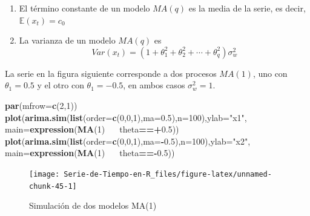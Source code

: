 \documentclass[12pt,]{krantz}
\makeatletter
\newenvironment{Shaded}{\begin{snugshade}}{\end{snugshade}}
\newcommand{\KeywordTok}[1]{\textcolor[rgb]{0.13,0.29,0.53}{\textbf{#1}}}
\newcommand{\DataTypeTok}[1]{\textcolor[rgb]{0.13,0.29,0.53}{#1}}
\newcommand{\DecValTok}[1]{\textcolor[rgb]{0.00,0.00,0.81}{#1}}
\newcommand{\FloatTok}[1]{\textcolor[rgb]{0.00,0.00,0.81}{#1}}
\newcommand{\StringTok}[1]{\textcolor[rgb]{0.31,0.60,0.02}{#1}}
\newcommand{\OperatorTok}[1]{\textcolor[rgb]{0.81,0.36,0.00}{\textbf{#1}}}
\newcommand{\ErrorTok}[1]{\textcolor[rgb]{0.64,0.00,0.00}{\textbf{#1}}}
\newcommand{\NormalTok}[1]{#1}
\newenvironment{kframe}{%
\medskip{}
\setlength{\fboxsep}{.8em}
 \def\at@end@of@kframe{}%
 \ifinner\ifhmode%
  \def\at@end@of@kframe{\end{minipage}}%
  \begin{minipage}{\columnwidth}%
 \fi\fi%
 \def\FrameCommand##1{\hskip\@totalleftmargin \hskip-\fboxsep
 \colorbox{shadecolor}{##1}\hskip-\fboxsep
     \hskip-\linewidth \hskip-\@totalleftmargin \hskip\columnwidth}%
 \MakeFramed {\advance\hsize-\width
   \@totalleftmargin\z@ \linewidth\hsize
   \@setminipage}}%
 {\par\unskip\endMakeFramed%
 \at@end@of@kframe}
\renewenvironment{Shaded}{\begin{kframe}}{\end{kframe}}
\theoremstyle{definition}
\theoremstyle{definition}
\theoremstyle{definition}
\theoremstyle{remark}
\makeatother
\begin{document}
\begin{enumerate}
\def\labelenumi{\arabic{enumi})}
\item
  El término constante de un modelo \(MA(q)\) es la media de la serie,
  es decir, \(\mathbb{E}(x_t)=c_0\)
\item
  La varianza de un modelo \(MA(q)\) es
  \[Var(x_t)=(1+\theta_1^2+\theta_2^2+\cdots+\theta_q^2)\sigma_w^2\]
\end{enumerate}

La serie en la figura siguiente corresponde a dos procesos \(MA(1)\),
uno con \(\theta_1=0.5\) y el otro con \(\theta_1=-0.5\), en ambos casos
\(\sigma_w^2=1\).

\begin{Shaded}
\begin{Highlighting}[]
\KeywordTok{par}\NormalTok{(}\DataTypeTok{mfrow=}\KeywordTok{c}\NormalTok{(}\DecValTok{2}\NormalTok{,}\DecValTok{1}\NormalTok{))}
\KeywordTok{plot}\NormalTok{(}\KeywordTok{arima.sim}\NormalTok{(}\KeywordTok{list}\NormalTok{(}\DataTypeTok{order=}\KeywordTok{c}\NormalTok{(}\DecValTok{0}\NormalTok{,}\DecValTok{0}\NormalTok{,}\DecValTok{1}\NormalTok{),}\DataTypeTok{ma=}\FloatTok{0.5}\NormalTok{),}\DataTypeTok{n=}\DecValTok{100}\NormalTok{),}\DataTypeTok{ylab=}\StringTok{"x1"}\NormalTok{,}
     \DataTypeTok{main=}\KeywordTok{expression}\NormalTok{(}\KeywordTok{MA}\NormalTok{(}\DecValTok{1}\NormalTok{)}\OperatorTok{~}\ErrorTok{~~}\NormalTok{theta}\OperatorTok{==+}\FloatTok{0.5}\NormalTok{))}
\KeywordTok{plot}\NormalTok{(}\KeywordTok{arima.sim}\NormalTok{(}\KeywordTok{list}\NormalTok{(}\DataTypeTok{order=}\KeywordTok{c}\NormalTok{(}\DecValTok{0}\NormalTok{,}\DecValTok{0}\NormalTok{,}\DecValTok{1}\NormalTok{),}\DataTypeTok{ma=}\OperatorTok{-}\FloatTok{0.5}\NormalTok{),}\DataTypeTok{n=}\DecValTok{100}\NormalTok{),}\DataTypeTok{ylab=}\StringTok{"x2"}\NormalTok{,}
     \DataTypeTok{main=}\KeywordTok{expression}\NormalTok{(}\KeywordTok{MA}\NormalTok{(}\DecValTok{1}\NormalTok{)}\OperatorTok{~}\ErrorTok{~~}\NormalTok{theta}\OperatorTok{==-}\FloatTok{0.5}\NormalTok{))}
\end{Highlighting}
\end{Shaded}

\begin{figure}

{\centering \texttt{[image: Serie-de-Tiempo-en-R\_files/figure-latex/unnamed-chunk-45-1]} 

}

\caption{Simulación de dos modelos MA(1)}\label{fig:unnamed-chunk-45}
\end{figure}
\end{document}
